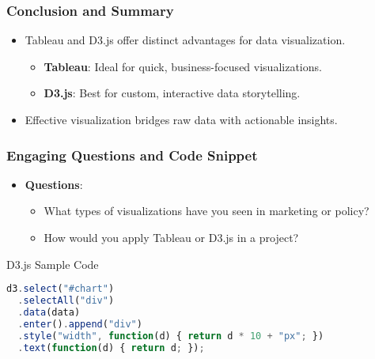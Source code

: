 \documentclass{beamer}
\begin{document}
\begin{frame}[fragile]
    \frametitle{Conclusion and Summary}
    \begin{itemize}
        \item Tableau and D3.js offer distinct advantages for data visualization.
        \begin{itemize}
            \item \textbf{Tableau}: Ideal for quick, business-focused visualizations.
            \item \textbf{D3.js}: Best for custom, interactive data storytelling.
        \end{itemize}
        \item Effective visualization bridges raw data with actionable insights.
    \end{itemize}
\end{frame}

\begin{frame}[fragile]
    \frametitle{Engaging Questions and Code Snippet}
    \begin{itemize}
        \item \textbf{Questions}:
            \begin{itemize}
                \item What types of visualizations have you seen in marketing or policy?
                \item How would you apply Tableau or D3.js in a project?
            \end{itemize}
    \end{itemize}
    
    \begin{block}{D3.js Sample Code}
    \begin{lstlisting}[language=JavaScript]
d3.select("#chart")
  .selectAll("div")
  .data(data)
  .enter().append("div")
  .style("width", function(d) { return d * 10 + "px"; })
  .text(function(d) { return d; });
    \end{lstlisting}
    \end{block}
\end{frame}
\end{document}
